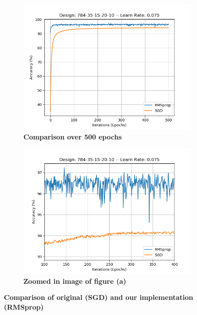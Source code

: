 \documentclass[12pt]{article}
\theoremstyle{definition}
\theoremstyle{plain}
\begin{document}
\begin{figure}[t!]
	\centering
	\begin{subfigure}[t]{0.5\textwidth}
		\centering
		\includegraphics[width=\textwidth]{Images/New/compare1.png}
		\caption{\textbf{Comparison over 500 epochs}}
		\label{fig:Compare1}
	\end{subfigure}%
	\begin{subfigure}[t]{0.5\textwidth}
		\centering
		\includegraphics[width=\textwidth]{Images/New/compare2.png}
		\caption{\textbf{Zoomed in image of figure (a)}}
		\label{fig:Compare2}
	\end{subfigure}
	\caption{\textbf{Comparison of original (SGD) and our implementation (RMSprop)}}
	\label{fig:Compare}
\end{figure}
\end{document}
